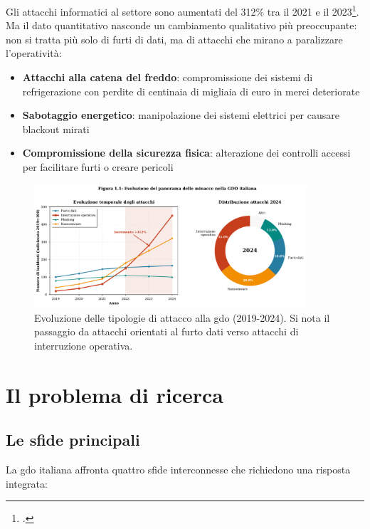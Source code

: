 Gli attacchi informatici al settore sono aumentati del 312\% tra il 2021 e il 2023\footcite{enisa2024retail}. Ma il dato quantitativo nasconde un cambiamento qualitativo più preoccupante: non si tratta più solo di furti di dati, ma di attacchi che mirano a paralizzare l'operatività:

\begin{itemize}
\item \textbf{Attacchi alla catena del freddo}: compromissione dei sistemi di refrigerazione con perdite di centinaia di migliaia di euro in merci deteriorate
\item \textbf{Sabotaggio energetico}: manipolazione dei sistemi elettrici per causare blackout mirati
\item \textbf{Compromissione della sicurezza fisica}: alterazione dei controlli accessi per facilitare furti o creare pericoli
\end{itemize}

\begin{figure}[htbp]
\centering
\includegraphics[width=0.9\textwidth]{thesis_figures/cap1/fig_1_1_attack_evolution.pdf}
\caption{Evoluzione delle tipologie di attacco alla \gls{gdo} (2019-2024). Si nota il passaggio da attacchi orientati al furto dati verso attacchi di interruzione operativa.}
\label{fig:attack_evolution}
\end{figure}

\section{Il problema di ricerca}
\label{sec:problema_ricerca}

\subsection{Le sfide principali}
\label{subsec:sfide_principali}

La \gls{gdo} italiana affronta quattro sfide interconnesse che richiedono una risposta integrata:

